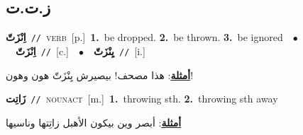 \documentclass[10pt,a4paper,twoside]{article} %
\begin{document}
\begin{multicols}{2}
\vspace{-3mm}
\subsection*{\color{blue}\foreignlanguage{arabic}{ز.ت.ت}\color{blue}{}} 

{\setlength\topsep{0pt}\textbf{\foreignlanguage{arabic}{اِنْزَتّ}}\ {\color{gray}\texttt{//}\color{black}}\ \textsc{verb}\ [p.]\ \textbf{1.}~be dropped.  \textbf{2.}~be thrown.  \textbf{3.}~be ignored\ \ $\bullet$\ \ \setlength\topsep{0pt}\textbf{\foreignlanguage{arabic}{اِنْزَتّ}}\ {\color{gray}\texttt{//}\color{black}}\ [c.]\ \ $\bullet$\ \ \setlength\topsep{0pt}\textbf{\foreignlanguage{arabic}{يِنْزَتّ}}\ {\color{gray}\texttt{//}\color{black}}\ [i.]\  \begin{flushright}\color{gray}\foreignlanguage{arabic}{\textbf{\underline{\foreignlanguage{arabic}{أمثلة}}}: هذا مصحف! بيصيرش يِنْزَتّ هون وهون!}\end{flushright}\color{black}} \vspace{2mm}

{\setlength\topsep{0pt}\textbf{\foreignlanguage{arabic}{زَاتِت}}\ {\color{gray}\texttt{//}\color{black}}\ \textsc{noun\textunderscore act}\ [m.]\ \textbf{1.}~throwing sth.  \textbf{2.}~throwing sth away\  \begin{flushright}\color{gray}\foreignlanguage{arabic}{\textbf{\underline{\foreignlanguage{arabic}{أمثلة}}}: أبصر وين بيكون الأهبل زاتِتها وناسيها}\end{flushright}\color{black}} \vspace{2mm}


\end{multicols}
\end{document}
